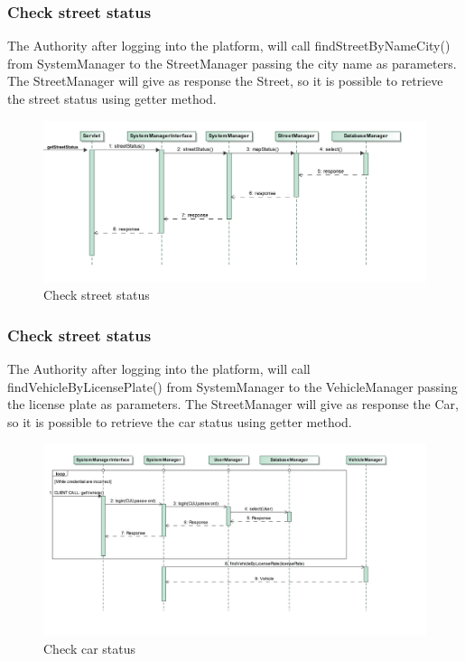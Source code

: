 \subsubsection{Check street status}
The Authority after logging into the platform, will call findStreetByNameCity() from SystemManager to the StreetManager passing the city name as parameters. The StreetManager will give as response the Street, so it is possible to retrieve the street status using getter method.
\begin{figure}[H]
	\centering
	\includegraphics[width=0.95\linewidth, height=0.35\textheight]{Images/RunTimeDiagram/Sequence5}
	\caption{Check street status}
	\label{fig:Check street status}
\end{figure}
\subsubsection{Check street status}
The Authority after logging into the platform, will call findVehicleByLicensePlate() from SystemManager to the VehicleManager passing the license plate as parameters. The StreetManager will give as response the Car, so it is possible to retrieve the car status using getter method.
\begin{figure}[H]
	\centering
	\includegraphics[width=0.95\linewidth, height=0.35\textheight]{Images/RunTimeDiagram/Sequence6}
	\caption{Check car status}
	\label{fig:Check car status}
\end{figure}



